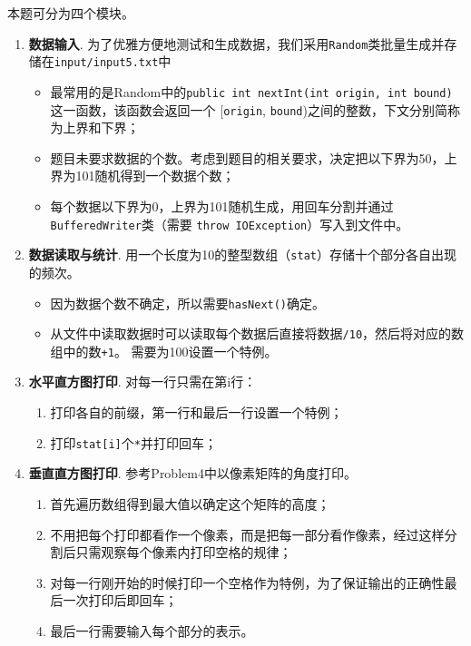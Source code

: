 本题可分为四个模块。
\begin{enumerate}
    \item \textbf{数据输入}. 为了优雅方便地测试和生成数据，我们采用\lstinline{Random}类批量生成并存储在\lstinline{input/input5.txt}中
        \begin{itemize}
            \item 最常用的是Random中的\lstinline{public int nextInt(int origin, int bound)}这一函数，该函数会返回一个
                [\lstinline{origin}, \lstinline{bound})之间的整数，下文分别简称为上界和下界；
            \item 题目未要求数据的个数。考虑到题目的相关要求，决定把以下界为50，上界为101随机得到一个数据个数；
            \item 每个数据以下界为0，上界为101随机生成，用回车分割并通过\lstinline{BufferedWriter}类（需要
                \lstinline{throw IOException}）写入到文件中。
        \end{itemize}
    \item \textbf{数据读取与统计}. 用一个长度为10的整型数组（\lstinline{stat}）存储十个部分各自出现的频次。
        \begin{itemize}
            \item 因为数据个数不确定，所以需要\lstinline{hasNext()}确定。
            \item 从文件中读取数据时可以读取每个数据后直接将数据\lstinline{/10}，然后将对应的数组中的数\lstinline{+1}。
                需要为100设置一个特例。
        \end{itemize}
    \item \textbf{水平直方图打印}. 对每一行只需在第i行：
        \begin{enumerate}
            \item 打印各自的前缀，第一行和最后一行设置一个特例；
            \item 打印\lstinline{stat[i]}个\lstinline{*}并打印回车；
        \end{enumerate}
    \item \textbf{垂直直方图打印}. 参考Problem4中以像素矩阵的角度打印。
        \begin{enumerate}
            \item 首先遍历数组得到最大值以确定这个矩阵的高度；
            \item 不用把每个打印都看作一个像素，而是把每一部分看作像素，经过这样分割后只需观察每个像素内打印空格的规律；
            \item 对每一行刚开始的时候打印一个空格作为特例，为了保证输出的正确性最后一次打印后即回车；
            \item 最后一行需要输入每个部分的表示。
        \end{enumerate}
\end{enumerate}

